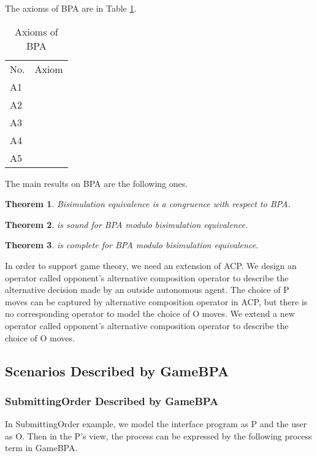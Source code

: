 \documentclass{fac}
\newtheorem{theorem}{Theorem}[section]
\begin{document}
The axioms of BPA are in Table \ref{AxiomOfBPA}.

\begin{center}
\begin{table}
  \begin{tabular}{@{}ll@{}}
\hline No. &Axiom\\
  A1 &  \\
  A2 &  \\
  A3 &  \\
  A4 &  \\
  A5 & \\
\end{tabular}
\caption{Axioms of BPA}
\label{AxiomOfBPA}
\end{table}
\end{center}

The main results on BPA are the following ones.

\begin{theorem}
Bisimulation equivalence is a congruence with respect to BPA.
\end{theorem}

\begin{theorem}
  is sound for BPA modulo bisimulation equivalence.
\end{theorem}

\begin{theorem}
 is complete for BPA modulo bisimulation equivalence.
\end{theorem}

In order to support game theory, we need an extension of ACP. We design an operator  called opponent's alternative composition operator to describe the alternative decision made by an outside autonomous agent. The choice of P moves can be captured by alternative composition operator  in ACP, but there is no corresponding operator to model the choice of O moves. We extend a new operator  called opponent's alternative composition operator to describe the choice of O moves.

\subsection{Scenarios Described by GameBPA}

\subsubsection{SubmittingOrder Described by GameBPA}

In SubmittingOrder example, we model the interface program as P and the user as O. Then in the P's view, the process can be expressed by the following process term in GameBPA.
\end{document}

